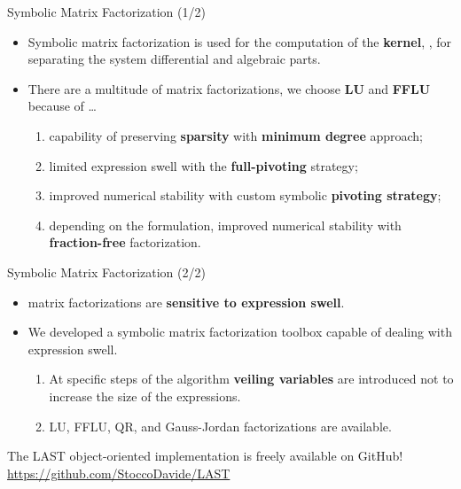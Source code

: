 \begin{frame}{Symbolic Matrix Factorization (1/2)}
  \begin{itemize}
    \item Symbolic matrix factorization is used for the computation of the \textbf{kernel}, \ie{}, for separating the system differential and algebraic parts.
    \item There are a multitude of matrix factorizations, we choose \textbf{\ac{LU}} and \textbf{\ac{FFLU}} because of \dots
    \begin{enumerate}
      \item capability of preserving \textbf{sparsity} with \textbf{minimum degree} approach;
      \item limited expression swell with the \textbf{full-pivoting} strategy;
      \item improved numerical stability with custom symbolic \textbf{pivoting strategy};
      \item depending on the formulation, improved numerical stability with \textbf{fraction-free} factorization.
    \end{enumerate}
  \end{itemize}
\end{frame}

\begin{frame}{Symbolic Matrix Factorization (2/2)}
  \begin{itemize}
    \item \Maple{} matrix factorizations are \textbf{sensitive to expression swell}.
    \item We developed a symbolic matrix factorization toolbox capable of dealing with expression swell.
    \begin{enumerate}
      \item At specific steps of the algorithm \textbf{veiling variables} are introduced not to increase the size of the expressions.
      \item \ac{LU}, \ac{FFLU}, \ac{QR}, and Gauss-Jordan factorizations are available.
    \end{enumerate}
\end{itemize}
  \begin{bbox}
  The LAST object-oriented implementation is freely available on GitHub! \\
  \centering \url{https://github.com/StoccoDavide/LAST}
\end{bbox}
\end{frame}

